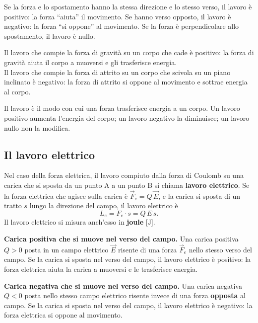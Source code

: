 Se la forza e lo spostamento hanno la stessa direzione e lo stesso verso, il lavoro è positivo: la forza ``aiuta'' il movimento. Se hanno verso opposto, il lavoro è negativo: la forza ``si oppone'' al movimento. Se la forza è perpendicolare allo spostamento, il lavoro è nullo.

\begin{esempio}
    Il lavoro che compie la forza di gravità su un corpo che cade è positivo: la forza di gravità aiuta il corpo a muoversi e gli trasferisce energia.\\
    Il lavoro che compie la forza di attrito su un corpo che scivola su un piano inclinato è negativo: la forza di attrito si oppone al movimento e sottrae energia al corpo.
\end{esempio}


\begin{concetto}
Il lavoro è il modo con cui una forza trasferisce energia a un corpo. Un lavoro positivo aumenta l'energia del corpo; un lavoro negativo la diminuisce; un lavoro nullo non la modifica.
\end{concetto}

\subsection{Il lavoro elettrico}

Nel caso della forza elettrica, il lavoro compiuto dalla forza di Coulomb su una carica che si sposta da un punto A a un punto B si chiama \textbf{lavoro elettrico}. Se la forza elettrica che agisce sulla carica è \(\vec{F}_e = Q\,\vec{E}\), e la carica si sposta di un tratto \(s\) lungo la direzione del campo, il lavoro elettrico è
\[
L_e = F_e \cdot s = Q\,E\,s.
\]
Il lavoro elettrico si misura anch'esso in \textbf{joule} [\(\text{J}\)].

\begin{esempio}
\textbf{Carica positiva che si muove nel verso del campo.} Una carica positiva \(Q > 0\) posta in un campo elettrico \(\vec{E}\) risente di una forza \(\vec{F}_e\) nello stesso verso del campo. Se la carica si sposta nel verso del campo, il lavoro elettrico è positivo: la forza elettrica aiuta la carica a muoversi e le trasferisce energia.
\end{esempio}

\begin{esempio}
\textbf{Carica negativa che si muove nel verso del campo.} Una carica negativa \(Q < 0\) posta nello stesso campo elettrico risente invece di una forza \textbf{opposta} al campo. Se la carica si sposta nel verso del campo, il lavoro elettrico è negativo: la forza elettrica si oppone al movimento.
\end{esempio}


